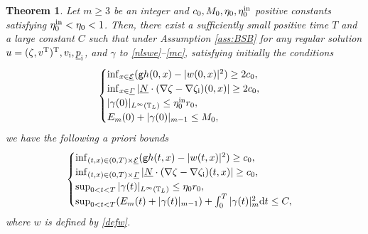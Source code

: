 \documentclass[10pt]{amsart}
\newcommand{\gr}{{\mathtt g}}
\newcommand{\cE}{{\mathcal E}}
\newcommand{\ul}[1]{\underline{#1}}
\newcommand{\itGamma}{\mathit{\Gamma}}
\newtheorem{theorem}{Theorem}[section]
\theoremstyle{definition}
\begin{document}
\begin{theorem}\label{th:main}
Let $m\geq3$ be an integer and $c_0, M_0, \eta_0, \eta_0^{\rm in}$ positive constants satisfying $\eta_0^{\rm in}<\eta_0<1$.
Then, there exist a sufficiently small positive time $T$ and a large constant $C$ such that under Assumption \ref{ass:BSB} for any regular solution
$u=(\zeta,v^{\rm T})^{\rm T},v_\mathrm{i},\ul{p}_\mathrm{i}$, and $\gamma$ to \eqref{nlswe}--\eqref{mc}, satisfying initially the conditions
\begin{equation}\label{EstIni}
\begin{cases}
\inf_{x\in\ul{\cE}}(\gr h(0,x)-|w(0,x)|^2) \geq 2c_0, \\
\inf_{x\in\ul{\itGamma}}| \ul{N}\cdot(\nabla\zeta-\nabla\zeta_\mathrm{i})(0,x)| \geq 2c_0, \\
|\gamma(0)|_{L^\infty(\mathbb{T}_L)} \leq \eta_0^{\rm in}r_0, \\
E_m(0) + |\gamma(0)|_{m-1} \leq M_0,
\end{cases}
\end{equation}
we have the following a priori bounds
\begin{equation}\label{APE}
\begin{cases}
\inf_{(t,x)\in(0,T)\times\ul{\cE}}(\gr h(t,x)-|w(t,x)|^2) \geq c_0, \\
\inf_{(t,x)\in(0,T)\times\ul{\itGamma}}| \ul{N}\cdot(\nabla\zeta-\nabla\zeta_\mathrm{i})(t,x)| \geq c_0, \\
\sup_{0<t<T}|\gamma(t)|_{L^\infty(\mathbb{T}_L)} \leq \eta_0r_0, \\
\sup_{0<t<T}(E_m(t) + |\gamma(t)|_{m-1}) + \int_0^T|\gamma(t)|_m^2{\rm d}t \leq C,
\end{cases}
\end{equation}
where $w$ is defined by \eqref{defw}.
\end{theorem}
\end{document}
